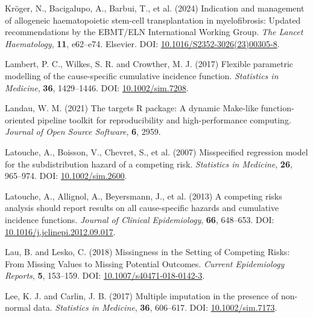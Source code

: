 \documentclass[
  letterpaper,
  DIV=11,
  numbers=noendperiod]{scrreprt}
\newlength{\cslhangindent}
\newlength{\cslentryspacingunit} %
\newenvironment{CSLReferences}[2] %
 {%
  \setlength{\parindent}{0pt}
  \ifodd #1
  \let\oldpar\par
  \def\par{\hangindent=\cslhangindent\oldpar}
  \fi
  \setlength{\parskip}{#2\cslentryspacingunit}
 }%
 {}
\begin{document}
\begin{CSLReferences}{1}{0}
\leavevmode{}%
Kröger, N., Bacigalupo, A., Barbui, T., et al. (2024) Indication and
management of allogeneic haematopoietic stem-cell transplantation in
myelofibrosis: Updated recommendations by the {EBMT}/{ELN International
Working Group}. \emph{The Lancet Haematology}, \textbf{11}, e62--e74.
Elsevier. DOI:
\href{https://doi.org/10.1016/S2352-3026(23)00305-8}{10.1016/S2352-3026(23)00305-8}.

\leavevmode{}%
Lambert, P. C., Wilkes, S. R. and Crowther, M. J. (2017) Flexible
parametric modelling of the cause-specific cumulative incidence
function. \emph{Statistics in Medicine}, \textbf{36}, 1429--1446. DOI:
\href{https://doi.org/10.1002/sim.7208}{10.1002/sim.7208}.

\leavevmode{}%
Landau, W. M. (2021) The targets {R} package: A dynamic {Make-like}
function-oriented pipeline toolkit for reproducibility and
high-performance computing. \emph{Journal of Open Source Software},
\textbf{6}, 2959.

\leavevmode{}%
Latouche, A., Boisson, V., Chevret, S., et al. (2007) Misspecified
regression model for the subdistribution hazard of a competing risk.
\emph{Statistics in Medicine}, \textbf{26}, 965--974. DOI:
\href{https://doi.org/10.1002/sim.2600}{10.1002/sim.2600}.

\leavevmode{}%
Latouche, A., Allignol, A., Beyersmann, J., et al. (2013) A competing
risks analysis should report results on all cause-specific hazards and
cumulative incidence functions. \emph{Journal of Clinical Epidemiology},
\textbf{66}, 648--653. DOI:
\href{https://doi.org/10.1016/j.jclinepi.2012.09.017}{10.1016/j.jclinepi.2012.09.017}.

\leavevmode{}%
Lau, B. and Lesko, C. (2018) Missingness in the {Setting} of {Competing
Risks}: From {Missing Values} to {Missing Potential Outcomes}.
\emph{Current Epidemiology Reports}, \textbf{5}, 153--159. DOI:
\href{https://doi.org/10.1007/s40471-018-0142-3}{10.1007/s40471-018-0142-3}.

\leavevmode{}%
Lee, K. J. and Carlin, J. B. (2017) Multiple imputation in the presence
of non-normal data. \emph{Statistics in Medicine}, \textbf{36},
606--617. DOI:
\href{https://doi.org/10.1002/sim.7173}{10.1002/sim.7173}.


\end{CSLReferences}
\end{document}

